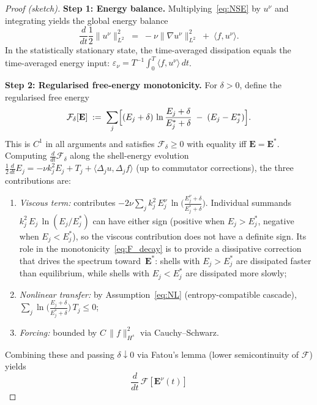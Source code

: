 \documentclass[12pt,a4paper]{article}
\theoremstyle{definition}
\theoremstyle{plain}
\theoremstyle{remark}
\begin{document}
\begin{proof}[Proof (sketch)]
\textbf{Step 1: Energy balance.}\;
Multiplying~\eqref{eq:NSE} by $u^\nu$ and integrating yields the global
energy balance
\begin{equation}\label{eq:energy_balance}
  \frac{d}{dt}\frac{1}{2}\|u^\nu\|_{L^2}^2
  \;=\;
  -\nu\|\nabla u^\nu\|_{L^2}^2
  \;+\;
  \langle f, u^\nu \rangle.
\end{equation}
In the statistically stationary state, the time-averaged dissipation
equals the time-averaged energy input:
$\varepsilon_\nu = T^{-1}\int_0^T \langle f, u^\nu \rangle\,dt$.

\textbf{Step 2: Regularised free-energy monotonicity.}\;
For $\delta > 0$, define the regularised free energy
\[
  \mathcal{F}_\delta[\mathbf{E}]
  \;:=\;
  \sum_j \Bigl[
    (E_j + \delta)\,\ln\frac{E_j + \delta}{E_j^* + \delta}
    \;-\; (E_j - E_j^*)
  \Bigr].
\]
This is $C^1$ in all arguments and satisfies $\mathcal{F}_\delta \ge 0$
with equality iff $\mathbf{E} = \mathbf{E}^*$.
Computing $\frac{d}{dt}\mathcal{F}_\delta$ along the shell-energy
evolution $\frac{1}{2}\frac{d}{dt}E_j = -\nu k_j^2 E_j + T_j
+ \langle \Delta_j u, \Delta_j f\rangle$ (up to commutator corrections),
the three contributions are:
\begin{enumerate}
  \item \emph{Viscous term:} contributes
    $-2\nu \sum_j k_j^2\,E_j^\nu\,
    \ln\!\bigl(\frac{E_j^\nu+\delta}{E_j^*+\delta}\bigr)$.
    Individual summands $k_j^2\,E_j\,\ln(E_j/E_j^*)$ can have either
    sign (positive when $E_j > E_j^*$, negative when $E_j < E_j^*$),
    so the viscous contribution does not have a definite sign.
    Its role in the monotonicity~\eqref{eq:F_decay} is to provide a
    dissipative correction that drives the spectrum toward~$\mathbf{E}^*$:
    shells with $E_j > E_j^*$ are dissipated faster than equilibrium,
    while shells with $E_j < E_j^*$ are dissipated more slowly;
  \item \emph{Nonlinear transfer:} by Assumption~\eqref{eq:NL}
    (entropy-compatible cascade),
    $\sum_j \ln\bigl(\frac{E_j+\delta}{E_j^*+\delta}\bigr)\,T_j
    \le 0$;
  \item \emph{Forcing:} bounded by $C\,\|f\|_{H^s}^2$ via Cauchy--Schwarz.
\end{enumerate}
Combining these and passing $\delta \downarrow 0$ via Fatou's lemma
(lower semicontinuity of $\mathcal{F}$) yields
\begin{equation}\label{eq:F_decay}
  \frac{d}{dt}\,\mathcal{F}[\mathbf{E}^\nu(t)]

\end{equation}
\end{proof}
\end{document}
